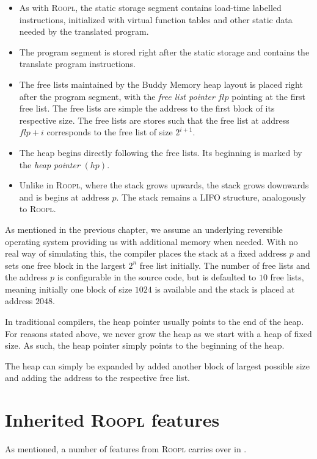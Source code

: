 \begin{itemize}
    \item As with \textsc{Roopl}, the static storage segment contains load-time labelled  instructions, initialized with virtual function tables and other static data needed by the translated program.

    \item The program segment is stored right after the static storage and contains the translate \rooplpp program instructions.

    \item The free lists maintained by the Buddy Memory heap layout is placed right after the program segment, with the \textit{free list pointer} $flp$ pointing at the first free list. The free lists are simple the address to the first block of its respective size. The free lists are stores such that the free list at address $flp + i$ corresponds to the free list of size $2^{i+1}$.   

    \item The heap begins directly following the free lists. Its beginning is marked by the \textit{heap pointer} $(hp)$. 

    \item Unlike in \textsc{Roopl}, where the stack grows upwards, the \rooplpp stack grows downwards and is begins at address $p$. The stack remains a LIFO structure, analogously to \textsc{Roopl}.
\end{itemize}

As mentioned in the previous chapter, we assume an underlying reversible operating system providing us with additional memory when needed. With no real way of simulating this, the \rooplpp compiler places the stack at a fixed address $p$ and sets one free block in the largest $2^n$ free list initially. The number of free lists and the address $p$ is configurable in the source code, but is defaulted to $10$ free lists, meaning initially one block of size $1024$ is available and the stack is placed at address $2048$.

In traditional compilers, the heap pointer usually points to the end of the heap. For reasons stated above, we never grow the heap as we start with a heap of fixed size. As such, the heap pointer simply points to the beginning of the heap.

The heap can simply be expanded by added another block of largest possible size and adding the address to the respective free list.


\section{Inherited \textsc{Roopl} features}
\label{sec:inherited-features}
As mentioned, a number of features from \textsc{Roopl} carries over in \rooplpp.

